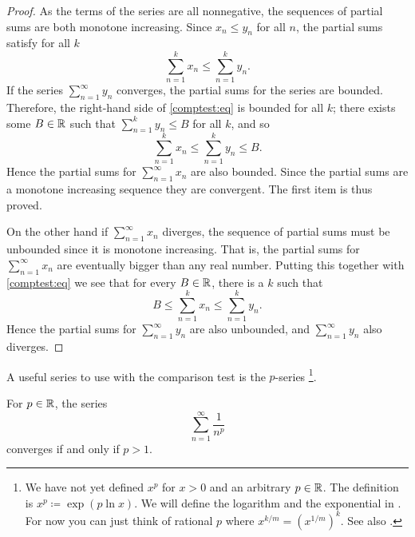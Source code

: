 \begin{proof}
As the terms of the series are all nonnegative, the sequences of
partial sums are both monotone increasing.
Since $x_n \leq y_n$ for all $n$, the partial sums
satisfy for all $k$
\begin{equation} \label{comptest:eq}
\sum_{n=1}^k x_n \leq \sum_{n=1}^k y_n .
\end{equation}
If the series $\sum_{n=1}^\infty y_n$ converges, the partial sums for the series
are bounded.  Therefore, the right-hand side of \eqref{comptest:eq}
is bounded for all $k$; there exists some $B \in {\mathbb{R}}$ such that
$\sum_{n=1}^k y_n \leq B$ for all $k$, and so
\begin{equation*}
\sum_{n=1}^k x_n \leq \sum_{n=1}^k y_n \leq B.
\end{equation*}
Hence the partial sums for $\sum_{n=1}^\infty x_n$
are also bounded.  Since the partial sums are a monotone increasing sequence
they are convergent.  The first item is thus proved.

On the other hand if $\sum_{n=1}^\infty x_n$ diverges, the sequence of partial sums
must be unbounded since it is monotone increasing.  That is, the partial
sums for $\sum_{n=1}^\infty x_n$ are eventually bigger than any real number.  Putting this
together with \eqref{comptest:eq} we see that for every $B \in
{\mathbb{R}}$, there is a $k$ such that 
\begin{equation*}
B \leq \sum_{n=1}^k x_n \leq \sum_{n=1}^k y_n .
\end{equation*}
Hence the partial sums for $\sum_{n=1}^\infty y_n$ are also unbounded, and
$\sum_{n=1}^\infty y_n$ also diverges.
\end{proof}

A useful series to use with the comparison test is the
$p$-series%
\footnote{We have not yet defined $x^p$ for $x > 0$ and
an arbitrary $p \in {\mathbb{R}}$.  The definition is $x^p \coloneqq \exp ( p \ln x )$.
We will define the logarithm and the exponential in .
For now you can just think of rational $p$
where $x^{k/m} = {(x^{1/m})}^{k}$.  See also .}.

\begin{prop}%
For $p \in {\mathbb{R}}$, 
the series
\begin{equation*}
\sum_{n=1}^\infty \frac{1}{n^p}
\end{equation*}
converges if and only if $p > 1$.
\end{prop}

